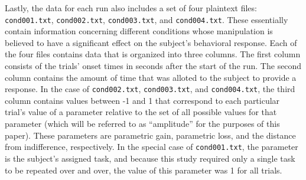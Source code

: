 \par \indent Lastly, the data for each run also includes a set of four plaintext
files: \texttt{cond001.txt}, \texttt{cond002.txt}, \texttt{cond003.txt}, and
\texttt{cond004.txt}. These essentially contain information concerning different
conditions whose manipulation is believed to have a significant effect on the
subject's behavioral response. Each of the four files contains data that is
organized into three columns. The first column consists of the trials' onset
times in seconds after the start of the run. The second column contains the
amount of time that was alloted to the subject to provide a response. In the
case of \texttt{cond002.txt}, \texttt{cond003.txt}, and \texttt{cond004.txt},
the third column contains values between -1 and 1 that correspond to each
particular trial's value of a parameter relative to the set of all possible
values for that parameter (which will be referred to as ``amplitude'' for the
purposes of this paper). These parameters are parametric gain, parametric loss, and the distance from indifference, respectively. In the special case of
\texttt{cond001.txt}, the parameter is the subject's assigned task, and because
this study required only a single task to be repeated over and over, the value
of this parameter was 1 for all trials.

